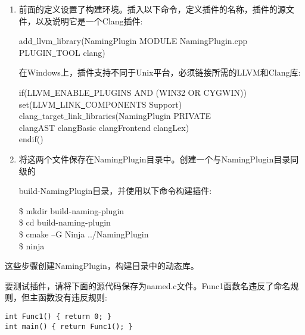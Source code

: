 \begin{enumerate}
\item 前面的定义设置了构建环境。插入以下命令，定义插件的名称，插件的源文件，以及说明它是一个Clang插件:
\begin{tcolorbox}[colback=white,colframe=black]
add\underline{~}llvm\underline{~}library(NamingPlugin MODULE NamingPlugin.cpp \\
\hspace*{3cm}PLUGIN\underline{~}TOOL clang)
\end{tcolorbox}

在Windows上，插件支持不同于Unix平台，必须链接所需的LLVM和Clang库:
\begin{tcolorbox}[colback=white,colframe=black]
if(LLVM\underline{~}ENABLE\underline{~}PLUGINS AND (WIN32 OR CYGWIN)) \\
\hspace*{0.5cm}set(LLVM\underline{~}LINK\underline{~}COMPONENTS Support) \\
\hspace*{0.5cm}clang\underline{~}target\underline{~}link\underline{~}libraries(NamingPlugin PRIVATE \\
\hspace*{1cm}clangAST clangBasic clangFrontend clangLex) \\
endif()
\end{tcolorbox}

\item 将这两个文件保存在NamingPlugin目录中。创建一个与NamingPlugin目录同级的\par build-NamingPlugin目录，并使用以下命令构建插件:
\begin{tcolorbox}[colback=white,colframe=black]
\$ mkdir build-naming-plugin \\
\$ cd build-naming-plugin \\
\$ cmake –G Ninja ../NamingPlugin \\
\$ ninja
\end{tcolorbox}

\end{enumerate}

这些步骤创建NamingPlugin，构建目录中的动态库。\par

要测试插件，请将下面的源代码保存为named.c文件。Func1函数名违反了命名规则，但主函数没有违反规则:\par

\begin{lstlisting}[caption={}]
int Func1() { return 0; }
int main() { return Func1(); }
\end{lstlisting}

